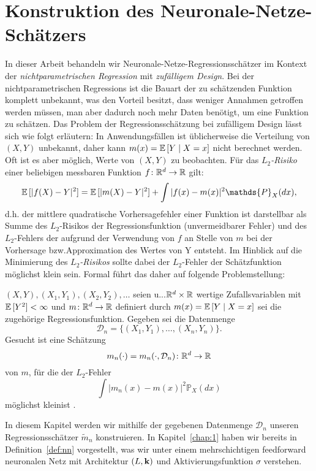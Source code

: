 \chapter{Konstruktion des Neuronale-Netze-Schätzers}
\label{chap:2}

In dieser Arbeit behandeln wir Neuronale-Netze-Regressionsschätzer im Kontext der \emph{nichtparametrischen Regression} mit \emph{zufälligem Design}. Bei der nichtparametrischen Regressions ist die Bauart der zu schätzenden Funktion komplett unbekannt, was den Vorteil besitzt, dass weniger Annahmen getroffen werden müssen, man aber dadurch noch mehr Daten benötigt, um eine Funktion zu schätzen.
Das Problem der Regressionsschätzung bei zufälligem Design lässt sich wie folgt erläutern: 
In Anwendungsfällen ist üblicherweise die Verteilung von $(X, Y)$ unbekannt, daher kann $m(x) = \mathbb{E}\,[Y \mid X = x]$ nicht berechnet werden. Oft ist es aber möglich, Werte von $(X, Y)$ zu beobachten.
Für das \emph{$L_2$-Risiko} einer beliebigen messbaren Funktion $f\colon \mathbb{R}^d \to \mathbb{R}$  gilt:
$$\E[|f(X) - Y|^2] = \E[|m(X) - Y|^2] + \int|f(x) - m(x)|^2 \mathds{P}_X (dx),$$
d.h. der mittlere quadratische Vorhersagefehler einer Funktion ist darstellbar als Summe des $L_2$-Risikos der Regressionsfunktion (unvermeidbarer Fehler) und des $L_2$-Fehlers der aufgrund der Verwendung von $f$ an Stelle von $m$ bei der Vorhersage bzw.\@ Approximation des Wertes von Y entsteht.
Im Hinblick auf die Minimierung des \emph{$L_2$-Risikos} sollte dabei der $L_2$-Fehler der Schätzfunktion möglichst klein sein.
Formal führt das daher auf folgende Problemstellung:

$(X, Y), (X_1, Y_1), (X_2, Y_2), \dots$ seien u.\@i.\@v.\@ $\mathbb{R}^d \times \mathbb{R}$ wertige Zufallsvariablen mit $\mathbb{E}\,[Y^2] < \infty$ und $m\colon\mathbb{R}^d \to \mathbb{R}$ definiert durch $m(x) = \mathbb{E}\,[Y \mid X = x]$ sei die zugehörige Regressionsfunktion. Gegeben sei die Datenmenge 
\begin{equation}
\label{dataset}
\mathcal{D}_n = \{(X_1, Y_1),\dots,(X_n, Y_n)\}.
\end{equation}
Gesucht ist eine Schätzung 
$$m_n(\cdot) = m_n(\cdot, \mathcal{D}_n)\colon\mathbb{R}^d \to \mathbb{R} $$
von $m$, für die der $L_2$-Fehler 
$$\int |m_n(x) - m(x)|^2 \mathds{P}_X(dx)$$
möglichst \glqq klein\grqq\@ ist \cite[Kapitel 1.1 und Kapitel 1.2]{gyoerfi2002}. 

In diesem Kapitel werden wir mithilfe der gegebenen Datenmenge $\mathcal{D}_n$ unseren Regressionsschätzer $\tilde{m}_n$ konstruieren. 
In Kapitel~\ref{chap:1} haben wir bereits in Definition~\ref{def:nn} vorgestellt, was wir unter einem mehrschichtigen feedforward neuronalen Netz mit Architektur $(L, \mathbf{k})$ und Aktivierungsfunktion $\sigma$ verstehen.

